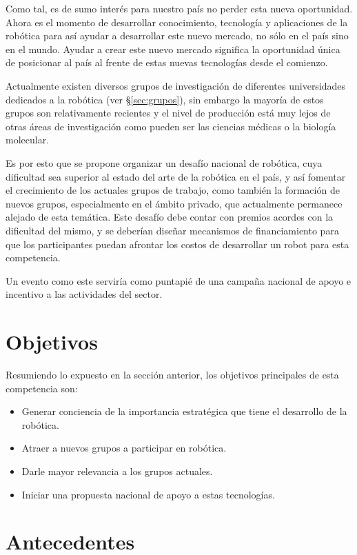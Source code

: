 \documentclass[a4paper,12pt]{article}
\begin{document}
Como tal, es de sumo interés para nuestro país no perder esta nueva oportunidad. Ahora es el momento de desarrollar conocimiento, tecnología y aplicaciones de la robótica para así ayudar a desarrollar este nuevo mercado, no sólo en el país sino en el mundo. Ayudar a crear este nuevo mercado significa la oportunidad única de posicionar al país al frente de estas nuevas tecnologías desde el comienzo.
 
Actualmente existen diversos grupos de investigación de diferentes universidades dedicados a la robótica (ver \S\ref{sec:grupos}), sin embargo la mayoría de estos grupos son relativamente recientes y el nivel de producción está muy lejos de otras áreas de investigación como pueden ser las ciencias médicas o la biología molecular.

Es por esto que se propone organizar un desafío nacional de robótica, cuya dificultad sea superior al estado del arte de la robótica en el país, y así fomentar el crecimiento de los actuales grupos de trabajo, como también la formación de nuevos grupos, especialmente en el ámbito privado, que actualmente permanece alejado de esta temática. Este desafío debe contar con premios acordes con la dificultad del mismo, y se deberían diseñar mecanismos de financiamiento para que los participantes puedan afrontar los costos de desarrollar un robot para esta competencia.

Un evento como este serviría como puntapié de una campaña nacional de apoyo e incentivo a las actividades del sector.

\section{Objetivos}

Resumiendo lo expuesto en la sección anterior, los objetivos principales de esta competencia son:

\begin{itemize}
 \item Generar conciencia de la importancia estratégica que tiene el desarrollo de la robótica.
 \item Atraer a nuevos grupos a participar en robótica.
 \item Darle mayor relevancia a los grupos actuales.
 \item Iniciar una propuesta nacional de apoyo a estas tecnologías.
\end{itemize}

\section{Antecedentes}
\end{document}
